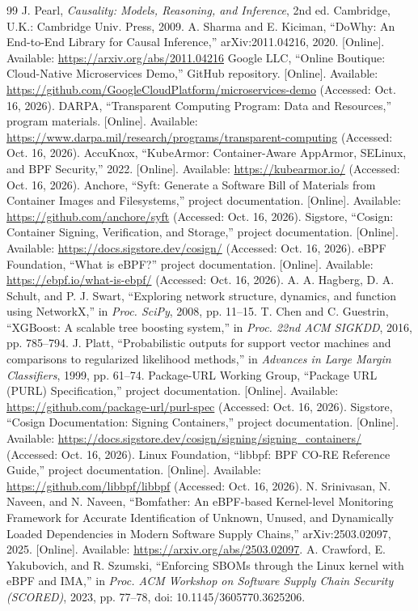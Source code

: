 \documentclass[conference]{IEEEtran}
\begin{document}
\begin{thebibliography}{99}
 J. Pearl, \emph{Causality: Models, Reasoning, and Inference}, 2nd ed. Cambridge, U.K.: Cambridge Univ. Press, 2009.
 A. Sharma and E. Kiciman, ``DoWhy: An End-to-End Library for Causal Inference,'' arXiv:2011.04216, 2020. [Online]. Available: \url{https://arxiv.org/abs/2011.04216}
 Google LLC, ``Online Boutique: Cloud-Native Microservices Demo,'' GitHub repository. [Online]. Available: \url{https://github.com/GoogleCloudPlatform/microservices-demo} (Accessed: Oct. 16, 2026).
 DARPA, ``Transparent Computing Program: Data and Resources,'' program materials. [Online]. Available: \url{https://www.darpa.mil/research/programs/transparent-computing} (Accessed: Oct. 16, 2026).
 AccuKnox, ``KubeArmor: Container-Aware AppArmor, SELinux, and BPF Security,'' 2022. [Online]. Available: \url{https://kubearmor.io/} (Accessed: Oct. 16, 2026).
 Anchore, ``Syft: Generate a Software Bill of Materials from Container Images and Filesystems,'' project documentation. [Online]. Available: \url{https://github.com/anchore/syft} (Accessed: Oct. 16, 2026).
 Sigstore, ``Cosign: Container Signing, Verification, and Storage,'' project documentation. [Online]. Available: \url{https://docs.sigstore.dev/cosign/} (Accessed: Oct. 16, 2026).
 eBPF Foundation, ``What is eBPF?'' project documentation. [Online]. Available: \url{https://ebpf.io/what-is-ebpf/} (Accessed: Oct. 16, 2026).
 A. A. Hagberg, D. A. Schult, and P. J. Swart, ``Exploring network structure, dynamics, and function using NetworkX,'' in \emph{Proc. SciPy}, 2008, pp. 11--15.
 T. Chen and C. Guestrin, ``XGBoost: A scalable tree boosting system,'' in \emph{Proc. 22nd ACM SIGKDD}, 2016, pp. 785--794.
 J. Platt, ``Probabilistic outputs for support vector machines and comparisons to regularized likelihood methods,'' in \emph{Advances in Large Margin Classifiers}, 1999, pp. 61--74.
 Package-URL Working Group, ``Package URL (PURL) Specification,'' project documentation. [Online]. Available: \url{https://github.com/package-url/purl-spec} (Accessed: Oct. 16, 2026).
 Sigstore, ``Cosign Documentation: Signing Containers,'' project documentation. [Online]. Available: \url{https://docs.sigstore.dev/cosign/signing/signing_containers/} (Accessed: Oct. 16, 2026).
 Linux Foundation, ``libbpf: BPF CO-RE Reference Guide,'' project documentation. [Online]. Available: \url{https://github.com/libbpf/libbpf} (Accessed: Oct. 16, 2026).
 N. Srinivasan, N. Naveen, and N. Naveen, ``Bomfather: An eBPF-based Kernel-level Monitoring Framework for Accurate Identification of Unknown, Unused, and Dynamically Loaded Dependencies in Modern Software Supply Chains,'' arXiv:2503.02097, 2025. [Online]. Available: \url{https://arxiv.org/abs/2503.02097}.
 A. Crawford, E. Yakubovich, and R. Szumski, ``Enforcing SBOMs through the Linux kernel with eBPF and IMA,'' in \emph{Proc. ACM Workshop on Software Supply Chain Security (SCORED)}, 2023, pp. 77--78, doi: 10.1145/3605770.3625206.
\end{thebibliography}
\end{document}
